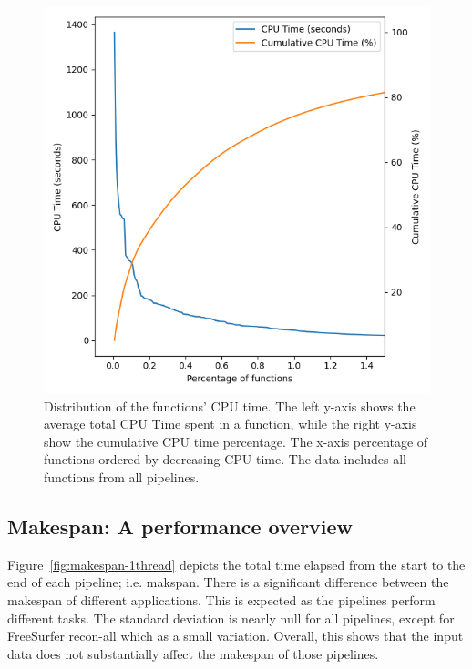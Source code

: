\documentclass[conference]{IEEEtran}
\begin{document}
\begin{figure}[h]
	\centering
	\includegraphics[width=\linewidth]{figures/global-longtail.png}
	\caption{Distribution of the functions' CPU time. The left y-axis shows the average total CPU Time spent in a function, while the right y-axis show the cumulative CPU time percentage. The x-axis percentage of functions ordered by decreasing CPU time. The data includes all functions from all pipelines.}
	\label{fig:long-tail-distribution}
\end{figure}
				
\subsection{Makespan: A performance overview}
Figure~\ref{fig:makespan-1thread} depicts the total time elapsed from the start to the end of each pipeline; i.e. makspan. There is a significant difference between the makespan of different applications. This is expected as the pipelines perform different tasks. The standard deviation is nearly null for all pipelines, except for FreeSurfer recon-all which as a small variation. Overall, this shows that the input data does not substantially affect the makespan of those pipelines.
			
\end{document}
